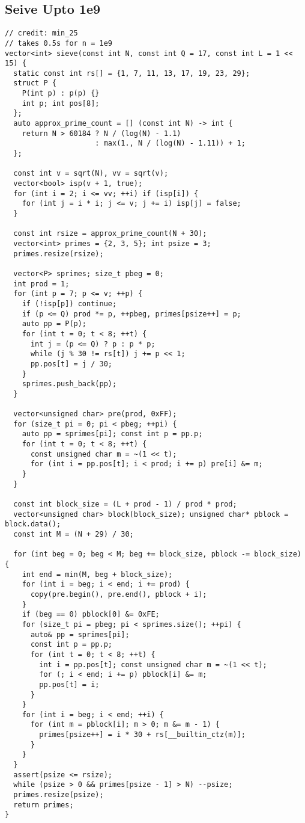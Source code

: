 \documentclass[10pt,a4paper,onesided]{article}
\begin{document}
\begin{multicols*}{3}
\subsection{Seive Upto 1e9}
\begin{lstlisting}
// credit: min_25
// takes 0.5s for n = 1e9
vector<int> sieve(const int N, const int Q = 17, const int L = 1 << 15) {
  static const int rs[] = {1, 7, 11, 13, 17, 19, 23, 29};
  struct P { 
    P(int p) : p(p) {}
    int p; int pos[8];
  };
  auto approx_prime_count = [] (const int N) -> int {
    return N > 60184 ? N / (log(N) - 1.1)
                     : max(1., N / (log(N) - 1.11)) + 1;
  };

  const int v = sqrt(N), vv = sqrt(v);
  vector<bool> isp(v + 1, true);
  for (int i = 2; i <= vv; ++i) if (isp[i]) {
    for (int j = i * i; j <= v; j += i) isp[j] = false;
  }

  const int rsize = approx_prime_count(N + 30);
  vector<int> primes = {2, 3, 5}; int psize = 3;
  primes.resize(rsize);

  vector<P> sprimes; size_t pbeg = 0;
  int prod = 1; 
  for (int p = 7; p <= v; ++p) {
    if (!isp[p]) continue;
    if (p <= Q) prod *= p, ++pbeg, primes[psize++] = p;
    auto pp = P(p); 
    for (int t = 0; t < 8; ++t) {
      int j = (p <= Q) ? p : p * p;
      while (j % 30 != rs[t]) j += p << 1;
      pp.pos[t] = j / 30;
    }
    sprimes.push_back(pp);
  }

  vector<unsigned char> pre(prod, 0xFF);
  for (size_t pi = 0; pi < pbeg; ++pi) {
    auto pp = sprimes[pi]; const int p = pp.p;
    for (int t = 0; t < 8; ++t) {
      const unsigned char m = ~(1 << t);
      for (int i = pp.pos[t]; i < prod; i += p) pre[i] &= m;
    }
  }

  const int block_size = (L + prod - 1) / prod * prod;
  vector<unsigned char> block(block_size); unsigned char* pblock = block.data();
  const int M = (N + 29) / 30;

  for (int beg = 0; beg < M; beg += block_size, pblock -= block_size) {
    int end = min(M, beg + block_size);
    for (int i = beg; i < end; i += prod) {
      copy(pre.begin(), pre.end(), pblock + i);
    }
    if (beg == 0) pblock[0] &= 0xFE;
    for (size_t pi = pbeg; pi < sprimes.size(); ++pi) {
      auto& pp = sprimes[pi];
      const int p = pp.p;
      for (int t = 0; t < 8; ++t) {
        int i = pp.pos[t]; const unsigned char m = ~(1 << t);
        for (; i < end; i += p) pblock[i] &= m;
        pp.pos[t] = i;
      }
    }
    for (int i = beg; i < end; ++i) {
      for (int m = pblock[i]; m > 0; m &= m - 1) {
        primes[psize++] = i * 30 + rs[__builtin_ctz(m)];
      }
    }
  }
  assert(psize <= rsize);
  while (psize > 0 && primes[psize - 1] > N) --psize;
  primes.resize(psize);
  return primes;
}


\end{lstlisting}
\end{multicols*}
\end{document}
